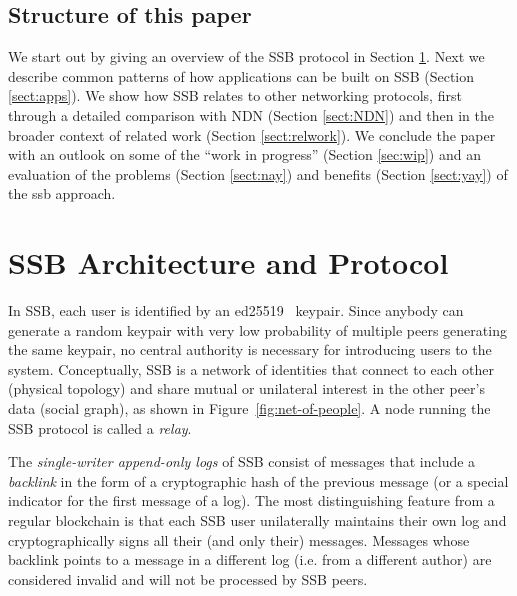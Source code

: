 \documentclass[9pt,sigconf,rewiew]{acmart}
\begin{document}
\subsection*{Structure of this paper}

We start out by giving an overview of the SSB protocol in Section \ref{sect:architecture}. Next we describe common patterns of how applications can be built on SSB (Section \ref{sect:apps}). We show how SSB relates to other networking protocols, first through a detailed comparison with NDN (Section \ref{sect:NDN}) and then in the broader context of related work (Section \ref{sect:relwork}). We conclude the paper with an outlook on some of the ``work in progress'' (Section \ref{sec:wip}) and an evaluation of the problems (Section \ref{sect:nay}) and benefits (Section \ref{sect:yay}) of the ssb approach.


\section{SSB Architecture and Protocol}
\label{sect:architecture}

In SSB, each user is identified by an ed25519~\cite{bernstein2012high} keypair. Since anybody can generate a random keypair with very low probability of multiple peers generating the same keypair, no central authority is necessary for introducing users to the system. Conceptually, SSB is a network of identities that connect to each other (physical topology) and share mutual or unilateral interest in the other peer's data (social graph), as shown in Figure~\ref{fig:net-of-people}. A node running the SSB protocol is called a \textit{relay}.

The {\em single-writer append-only logs} of SSB consist of  messages that include a {\em backlink} in the form of a cryptographic hash of the previous message (or a special indicator for the first message of a log). The most distinguishing feature from a regular blockchain is that each SSB user unilaterally maintains their own log and cryptographically signs all their (and only their) messages. Messages whose backlink points to a message in a different log (i.e. from a different author) are considered invalid and will not be processed by SSB peers.

\end{document}
